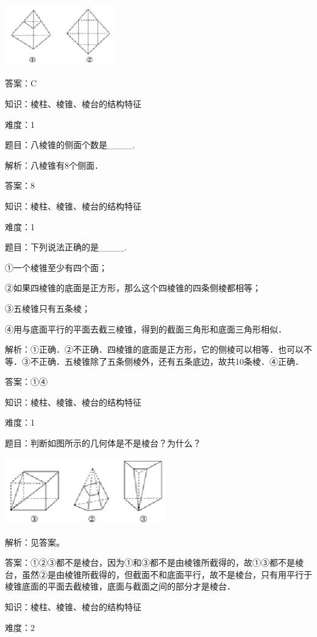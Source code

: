 \documentclass{article} %
\begin{document}
\includegraphics*[width=1.87in, height=1.05in, keepaspectratio=false]{image7}

答案：C

知识：棱柱、棱锥、棱台的结构特征

难度：1

题目：八棱锥的侧面个数是\_\_\_\_.

解析：八棱锥有8个侧面．

答案：8

知识：棱柱、棱锥、棱台的结构特征

难度：1

题目：下列说法正确的是\_\_\_\_.

①一个棱锥至少有四个面；

②如果四棱锥的底面是正方形，那么这个四棱锥的四条侧棱都相等；

③五棱锥只有五条棱；

④用与底面平行的平面去截三棱锥，得到的截面三角形和底面三角形相似．

解析：①正确．②不正确．四棱锥的底面是正方形，它的侧棱可以相等．也可以不等．③不正确．五棱锥除了五条侧棱外，还有五条底边，故共10条棱．④正确．

答案：①④


知识：棱柱、棱锥、棱台的结构特征

难度：1

题目：判断如图所示的几何体是不是棱台？为什么？

\includegraphics*[width=2.76in, height=1.15in, keepaspectratio=false]{image8}

解析：见答案。

答案：①②③都不是棱台，因为①和③都不是由棱锥所截得的，故①③都不是棱台，虽然②是由棱锥所截得的，但截面不和底面平行，故不是棱台，只有用平行于棱锥底面的平面去截棱锥，底面与截面之间的部分才是棱台．

知识：棱柱、棱锥、棱台的结构特征

难度：2
\end{document}
